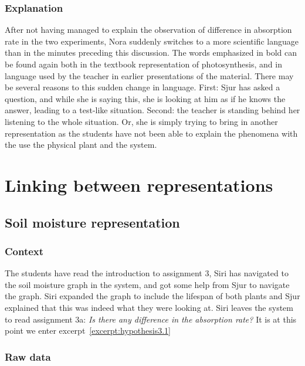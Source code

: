 \subsubsection*{Explanation}
After not having managed to explain the observation of difference in absorption rate in the two experiments, Nora suddenly switches to a more scientific language than in the minutes preceding this discussion. The words emphasized in bold can be found again both in the textbook representation of photosynthesis, and in language used by the teacher in earlier presentations of the material. There may be several reasons to this sudden change in language. First: Sjur has asked a question, and while she is saying this, she is looking at him as if he knows the answer, leading to a test-like situation. Second: the teacher is standing behind her listening to the whole situation. Or, she is simply trying to bring in another representation as the students have not been able to explain the phenomena with the use the physical plant and the system. 


\section{Linking between representations}
\subsection{Soil moisture representation}


\subsubsection*{Context}
The students have read the introduction to assignment 3, Siri has navigated to the soil moisture graph in the system, and got some help from Sjur to navigate the graph. Siri expanded the graph to include the lifespan of both plants and Sjur explained that this was indeed what they were looking at. Siri leaves the system to read assignment 3a: \emph{Is there any difference in the absorption rate?} It is at this point we enter excerpt~\ref{excerpt:hypothesis3.1}



\subsubsection*{Raw data}

